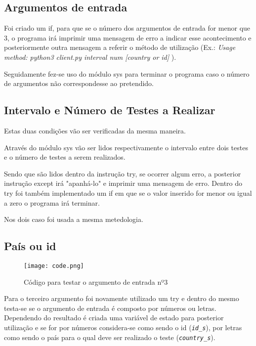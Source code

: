\documentclass{report}
\begin{document}
\subsection{Argumentos de entrada}

Foi criado um if, para que se o número dos argumentos de entrada for menor que 3, o programa irá imprimir uma mensagem de erro a indicar esse acontecimento e posteriormente outra mensagem a referir o método de utilização (Ex.: {\itshape Usage method: python3 client.py interval num [country or id]} ).

Seguidamente fez-se uso do módulo sys para terminar o programa caso o número de argumentos não correspondesse ao pretendido.


\subsection{Intervalo e Número de Testes a Realizar}

Estas duas condições vão ser verificadas da mesma maneira.

Através do módulo sys vão ser lidos respectivamente o intervalo entre dois testes e o número de testes a serem realizados.

Sendo que são lidos dentro da instrução try, se ocorrer algum erro, a posterior instrução except irá "apanhá-lo" e imprimir uma mensagem de erro. Dentro do try foi também implementado um if em que se o valor inserido for menor ou igual a zero o programa irá terminar.

Nos dois caso foi usada a mesma metedologia.

\subsection{País ou id}

\begin{figure}[h]
\center %
\texttt{[image: code.png]}
\caption{Código para testar o argumento de entrada nº3}
\label{fig:code}
\end{figure}

Para o terceiro argumento foi novamente utilizado um try e dentro do mesmo testa-se se o argumento de entrada é composto por números ou letras. Dependendo do resultado é criada uma variável de estado para posterior utilização e se for por números considera-se como sendo o id ({\itshape \texttt{id\_s}}), por letras como sendo o país para o qual deve ser realizado o teste ({\itshape \texttt{country\_s}}). 
\end{document}

